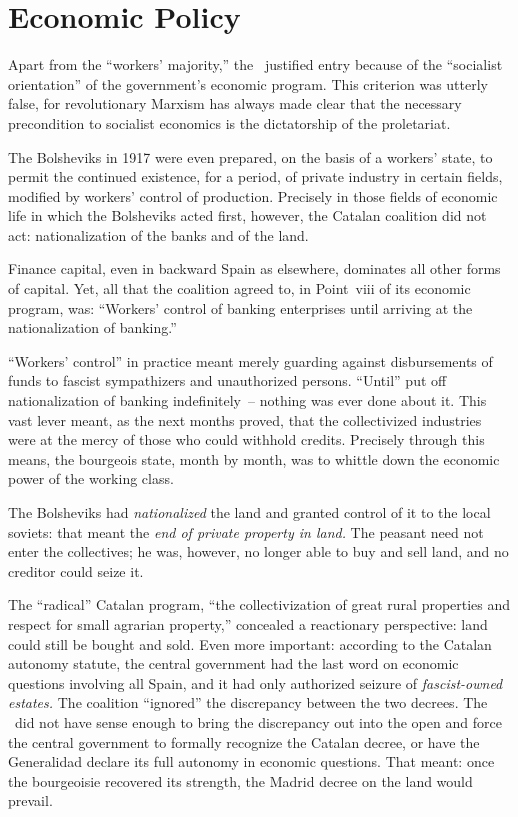 \section{Economic Policy}

Apart from the ``workers’ majority,'' the \POUM\ justified entry because of the ``socialist orientation'' of the government’s economic program. This criterion was utterly false, for revolutionary Marxism has always made clear that the necessary precondition to socialist economics is the dictatorship of the proletariat.

The Bolsheviks in 1917 were even prepared, on the basis of a workers’ state, to permit the continued existence, for a period, of private industry in certain fields, modified by workers’ control of production. Precisely in those fields of economic life in which the Bolsheviks acted first, however, the Catalan coalition did not act: nationalization of the banks and of the land.

Finance capital, even in backward Spain as elsewhere, dominates all other forms of capital. Yet, all that the coalition agreed to, in Point~viii of its economic program, was: ``Workers' control of banking enterprises until arriving at the nationalization of banking.''

``Workers' control'' in practice meant merely guarding against disbursements of funds to fascist sympathizers and unauthorized persons. ``Until'' put off nationalization of banking indefinitely~-- nothing was ever done about it. This vast lever meant, as the next months proved, that the collectivized industries were at the mercy of those who could withhold credits. Precisely through this means, the bourgeois state, month by month, was to whittle down the economic power of the working class.

The Bolsheviks had \emph{nationalized} the land and granted control of it to the local soviets: that meant the \emph{end of private property in land.} The peasant need not enter the collectives; he was, however, no longer able to buy and sell land, and no creditor could seize it.

The ``radical'' Catalan program, ``the collectivization of great rural properties and respect for small agrarian property,'' concealed a reactionary perspective: land could still be bought and sold. Even more important: according to the Catalan autonomy statute, the central government had the last word on economic questions involving all Spain, and it had only authorized seizure of \emph{fascist-owned estates.} The coalition ``ignored'' the discrepancy between the two decrees. The \POUM\ did not have sense enough to bring the discrepancy out into the open and force the central government to formally recognize the Catalan decree, or have the Generalidad declare its full autonomy in economic questions. That meant: once the bourgeoisie recovered its strength, the Madrid decree on the land would prevail.

